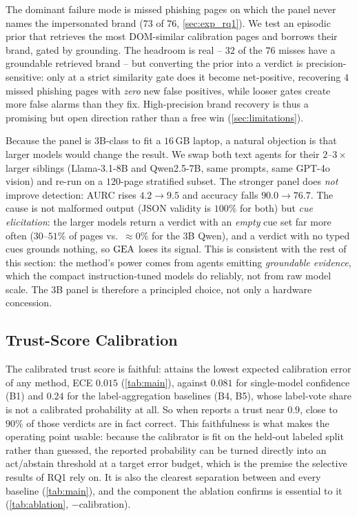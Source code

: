 The dominant failure mode is missed phishing pages on which the panel never names the
impersonated brand ($73$ of $76$, \autoref{sec:exp_rq1}). We test an episodic prior that
retrieves the most DOM-similar calibration pages and borrows their brand, gated by grounding.
The headroom is real -- $32$ of the $76$ misses have a groundable retrieved brand -- but
converting the prior into a verdict is precision-sensitive: only at a strict similarity gate
does it become net-positive, recovering $4$ missed phishing pages with \emph{zero} new false
positives, while looser gates create more false alarms than they fix. High-precision brand
recovery is thus a promising but open direction rather than a free win (\autoref{sec:limitations}).

Because the panel is $3$B-class to fit a $16$\,GB laptop, a natural objection is that larger
models would change the result. We swap both text agents for their $2$--$3\times$ larger
siblings (Llama-3.1-8B and Qwen2.5-7B, same prompts, same GPT-4o vision) and re-run on a
$120$-page stratified subset. The stronger panel does \emph{not} improve detection: AURC rises
$4.2\to9.5$ and accuracy falls $90.0\to76.7$. The cause is not malformed output (JSON validity
is $100\%$ for both) but \emph{cue elicitation}: the larger models return a verdict with an
\emph{empty} cue set far more often ($30$--$51\%$ of pages vs.\ $\approx0\%$ for the $3$B
Qwen), and a verdict with no typed cues grounds nothing, so $\mathrm{GEA}$ loses its signal. This
is consistent with the rest of this section: the method's power comes from agents emitting
\emph{groundable evidence}, which the compact instruction-tuned models do reliably, not from
raw model scale. The $3$B panel is therefore a principled choice, not only a hardware
concession.

\subsection{Trust-Score Calibration}
\label{sec:exp_rq4}
The calibrated trust score is faithful: \toolname{} attains the lowest expected
calibration error of any method, ECE $0.015$ (\autoref{tab:main}), against $0.081$ for
single-model confidence (B1) and $0.24$ for the label-aggregation baselines (B4, B5),
whose label-vote share is not a calibrated probability at all. So when \toolname{}
reports a trust near $0.9$, close to $90\%$ of those verdicts are in fact correct. This
faithfulness is what makes the operating point usable: because the calibrator is fit on
the held-out labeled split rather than guessed, the reported probability can be turned
directly into an act/abstain threshold at a target error budget, which is the premise the
selective results of RQ1 rely on. It is also the clearest separation between \toolname{}
and every baseline (\autoref{tab:main}), and the component the ablation confirms is
essential to it (\autoref{tab:ablation}, $-$calibration).

